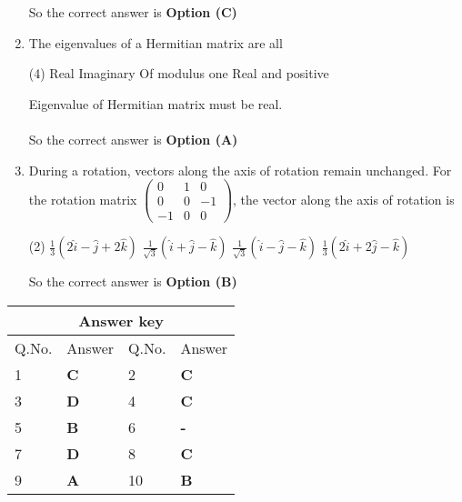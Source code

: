 \begin{enumerate}[label=\color{ocre}\textbf{\arabic*.}]
\begin{answer}
		So the correct answer is \textbf{Option (C)}
	\end{answer}
	\item The eigenvalues of a Hermitian matrix are all
	{}
	\begin{tasks}(4)
		\task[\textbf{A.}]  Real
		\task[\textbf{B.}] Imaginary
		\task[\textbf{C.}] Of modulus one
		\task[\textbf{D.}] Real and positive
	\end{tasks}
	\begin{answer}
		Eigenvalue of Hermitian matrix must be real.\\\\
		So the correct answer is \textbf{Option (A)}
	\end{answer}
	\item During a rotation, vectors along the axis of rotation remain unchanged. For the rotation matrix $\left(\begin{array}{ccc}0 & 1 & 0 \\ 0 & 0 & -1 \\ -1 & 0 & 0\end{array}\right)$, the vector along the axis of rotation is
	{}
	\begin{tasks}(2)
		\task[\textbf{A.}] $\frac{1}{3}(2 \hat{i}-\hat{j}+2 \hat{k})$
		\task[\textbf{B.}]  $\frac{1}{\sqrt{3}}(\hat{i}+\hat{j}-\hat{k})$
		\task[\textbf{C.}] $\frac{1}{\sqrt{3}}(\hat{i}-\hat{j}-\hat{k})$
		\task[\textbf{D.}] $\frac{1}{3}(2 \hat{i}+2 \hat{j}-\hat{k})$
	\end{tasks}
	\begin{answer}
		So the correct answer is \textbf{Option (B)}
	\end{answer}
\end{enumerate}
\setlength\arrayrulewidth{1pt}
\begin{table}[H]
	\centering
	\begin{tabular}{|p{1.5cm}|p{1.5cm}||p{1.5cm}|p{1.5cm}|}
		\hline
		\multicolumn{4}{|c|}{\textbf{Answer key}}\\\hline\hline
		\rowcolor{ocrel}Q.No.&Answer&Q.No.&Answer\\\hline
		1&\textbf{C} &2&\textbf{C}\\\hline 
		3&\textbf{D} &4&\textbf{C} \\\hline
		5&\textbf{B} &6&\textbf{-} \\\hline
		7&\textbf{D}&8&\textbf{C}\\\hline
		9&\textbf{A}&10&\textbf{B}\\\hline
		
	\end{tabular}
\end{table}
